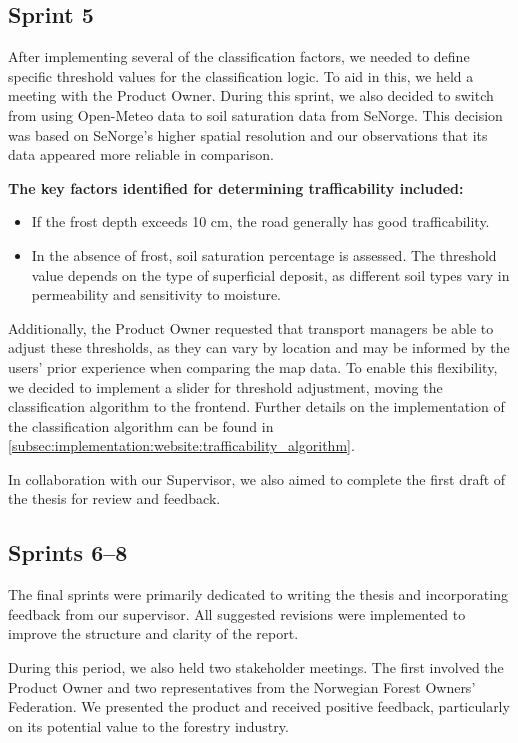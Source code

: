 \subsection*{Sprint 5}

After implementing several of the classification factors, we needed to define specific threshold values for the classification logic. To aid in this, we held a meeting with the Product Owner. During this sprint, we also decided to switch from using Open-Meteo data to soil saturation data from SeNorge. This decision was based on SeNorge's higher spatial resolution and our observations that its data appeared more reliable in comparison.

\textbf{The key factors identified for determining trafficability included:}

\begin{itemize}
    \item If the frost depth exceeds 10 cm, the road generally has good trafficability.
    \item In the absence of frost, soil saturation percentage is assessed. The threshold value depends on the type of superficial deposit, as different soil types vary in permeability and sensitivity to moisture.
\end{itemize}

Additionally, the Product Owner requested that transport managers be able to adjust these thresholds, as they can vary by location and may be informed by the users' prior experience when comparing the map data. To enable this flexibility, we decided to implement a slider for threshold adjustment, moving the classification algorithm to the frontend. Further details on the implementation of the classification algorithm can be found in \autoref{subsec:implementation:website:trafficability_algorithm}.

In collaboration with our Supervisor, we also aimed to complete the first draft of the thesis for review and feedback.

\subsection*{Sprints 6–8}

The final sprints were primarily dedicated to writing the thesis and incorporating feedback from our supervisor. All suggested revisions were implemented to improve the structure and clarity of the report.

During this period, we also held two stakeholder meetings. The first involved the Product Owner and two representatives from the Norwegian Forest Owners' Federation. We presented the product and received positive feedback, particularly on its potential value to the forestry industry.

